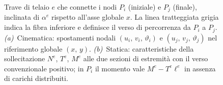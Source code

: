\begin{figure}[htbp]
	\caption{Trave di telaio $e$ che connette i nodi $P_i$ (iniziale)
		e $P_j$ (finale), inclinata di $\alpha^e$ rispetto all'asse
		globale $x$. La linea tratteggiata grigia indica la fibra
		inferiore e definisce il verso di percorrenza da $P_i$ a $P_j$.
		\emph{(a)}~Cinematica: spostamenti nodali
		$(u_i,\,v_i,\,\vartheta_i)$ e $(u_j,\,v_j,\,\vartheta_j)$
		nel riferimento globale $(x,\,y)$.
		\emph{(b)}~Statica: caratteristiche della sollecitazione
		$N^e$, $T^e$, $M^e$ alle due sezioni di estremità con il
		verso convenzionale positivo; in $P_i$ il momento vale
		$M^e - T^e\ell^e$ in assenza di carichi distribuiti.}
	\label{fig:trave_telaio_cin_stat}
\end{figure}
